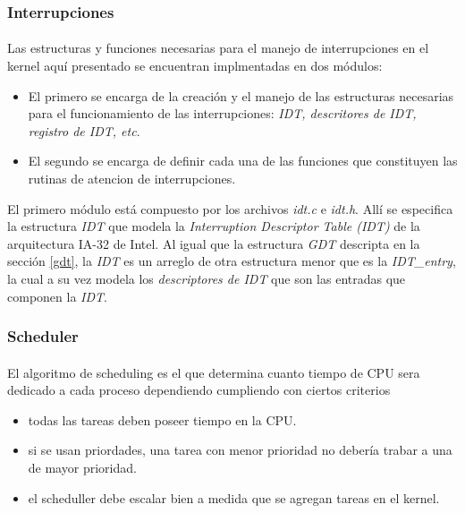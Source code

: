 \documentclass[11pt, a4paper]{article}
\begin{document}
\subsubsection{Interrupciones}
	\paragraph{}
	Las estructuras y funciones necesarias para el manejo de interrupciones en el kernel aquí presentado se encuentran implmentadas en dos módulos: 
	\begin{itemize}
		\item El primero se encarga de la creación y el manejo de las estructuras necesarias para el funcionamiento de las interrupciones: \textit{IDT, descritores de IDT, registro de IDT, etc}.
		\item El segundo se encarga de definir cada una de las funciones que constituyen las rutinas de atencion de interrupciones.
	\end{itemize}
	
	El primero módulo está compuesto por los archivos \textit{idt.c} e \textit{idt.h}. Allí se especifica la estructura \textit{IDT} que modela la \textit{Interruption Descriptor Table (IDT)} de la arquitectura IA-32 de Intel. Al igual que la estructura \textit{GDT} descripta en la sección \ref{gdt}, la \textit{IDT} es un arreglo de otra estructura menor que es la \textit{IDT\_entry}, la cual a su vez modela los \textit{descriptores de IDT} que son las entradas que componen la \textit{IDT}.
	
	


\subsubsection{Scheduler}
\paragraph{}
El algoritmo de scheduling es el que determina cuanto tiempo de CPU sera dedicado a cada proceso dependiendo cumpliendo con ciertos criterios
\begin{itemize}
\item todas las tareas deben poseer tiempo en la CPU.
\item si se usan priordades, una tarea con menor prioridad no debería trabar a una de mayor prioridad.
\item el scheduller debe escalar bien a medida que se agregan tareas en el kernel.
\end{itemize}
\end{document}

